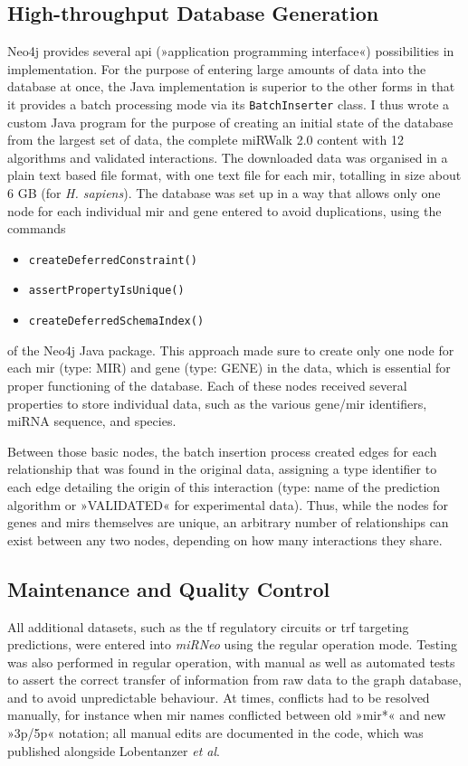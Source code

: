 \subsection{High-throughput Database Generation}
Neo4j provides several \acs{api} (»application programming interface«) possibilities in implementation. For the purpose of entering large amounts of data into the database at once, the Java implementation is superior to the other forms in that it provides a batch processing mode via its \texttt{BatchInserter} class. I thus wrote a custom Java program for the purpose of creating an initial state of the database from the largest set of data, the complete miRWalk 2.0 content with 12 algorithms and validated interactions. The downloaded data was organised in a plain text based file format, with one text file for each \ac{mir}, totalling in size about 6 GB (for \textit{H. sapiens}). The database was set up in a way that allows only one node for each individual \ac{mir} and gene entered to avoid duplications, using the commands 
\begin{itemize}[noitemsep, leftmargin=.5cm, label={\tiny\raisebox{1ex}{\textbullet}}]
\item \texttt{createDeferredConstraint()}
\item \texttt{assertPropertyIsUnique()}
\item \texttt{createDeferredSchemaIndex()} 
\end{itemize}
of the Neo4j Java package. This approach made sure to create only one node for each \ac{mir} (type: MIR) and gene (type: GENE) in the data, which is essential for proper functioning of the database. Each of these nodes received several properties to store individual data, such as the various gene/\ac{mir} identifiers, miRNA sequence, and species. 

Between those basic nodes, the batch insertion process created edges for each relationship that was found in the original data, assigning a type identifier to each edge detailing the origin of this interaction (type: name of the prediction algorithm or »VALIDATED« for experimental data). Thus, while the nodes for genes and \acp{mir} themselves are unique, an arbitrary number of relationships can exist between any two nodes, depending on how many interactions they share.

\subsection{Maintenance and Quality Control}
All additional datasets, such as the \ac{tf} regulatory circuits or \ac{trf} targeting predictions, were entered into \textit{miRNeo} using the regular operation mode. Testing was also performed in regular operation, with manual as well as automated tests to assert the correct transfer of information from raw data to the graph database, and to avoid unpredictable behaviour. At times, conflicts had to be resolved manually, for instance when \ac{mir} names conflicted between old »\ac{mir}*« and new »3p/5p« notation; all manual edits are documented in the code, which was published alongside Lobentanzer \emph{et al}.\cite{Lobentanzer2019a}

